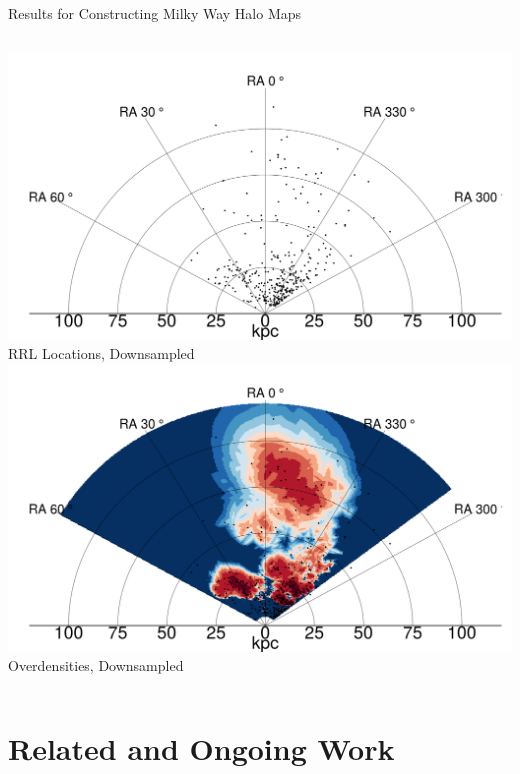 \documentclass[12pt]{beamer}
\begin{document}
\begin{frame}{Results for Constructing Milky Way Halo Maps}
\begin{columns}
    \begin{column}{0.5\textwidth}
      \begin{center}
    \includegraphics[scale=\tw]{figs/density_rr_model_sampled_points.png}\\
    RRL Locations, Downsampled\\
    \includegraphics[scale=\tw]{figs/density_rr_model_sampled.png}\\
    Overdensities, Downsampled
    \end{center}
  \end{column}

\end{columns}
\end{frame}


\section{Related and Ongoing Work}
\end{document}
